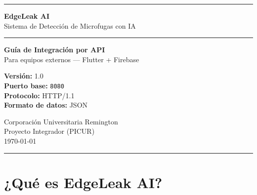 \documentclass[12pt, a4paper]{article}
\begin{document}

\begin{titlepage}
  \centering
  \vspace*{2cm}

  {\color{edgeblue}\rule{\linewidth}{2pt}}
  \vspace{0.5cm}

  {\Huge\bfseries\color{edgeblue} EdgeLeak AI}\\[0.4cm]
  {\Large\color{edgegray} Sistema de Detección de Microfugas con IA}\\[1cm]

  {\color{edgeblue}\rule{\linewidth}{1pt}}
  \vspace{1cm}

  {\LARGE\bfseries Guía de Integración por API}\\[0.3cm]
  {\large\color{edgegray} Para equipos externos — Flutter + Firebase}\\[2cm]

  \begin{tcolorbox}[
    enhanced,
    colback=edgelightblue,
    colframe=edgeblue,
    width=0.75\textwidth,
    center,
    left=12pt, right=12pt, top=8pt, bottom=8pt,
  ]
    \centering
    \textbf{Versión:} 1.0\\
    \textbf{Puerto base:} \texttt{8080}\\
    \textbf{Protocolo:} HTTP/1.1\\
    \textbf{Formato de datos:} JSON
  \end{tcolorbox}

  \vspace{2cm}

  {\color{edgegray}\large
    Corporación Universitaria Remington\\
    Proyecto Integrador (PICUR)\\
    \vspace{0.3cm}
    \today
  }

  \vfill
  {\color{edgeblue}\rule{\linewidth}{2pt}}
\end{titlepage}

\tableofcontents
\newpage

\section{¿Qué es EdgeLeak AI?}
\end{document}
